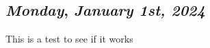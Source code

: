 \begin{center}
\section*{\month}
\end{center}

\def\day{\textit{January 1st, 2024}}
\def\weekday{\textit{Monday}}
\subsection*{\weekday, \day}

This is a test to see if it works